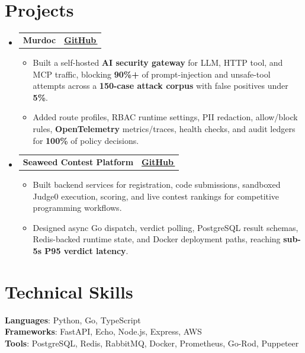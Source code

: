 \documentclass[letterpaper,11pt]{article}
\makeatletter
\newcommand{\bodyhref}[2]{\href{#1}{\underline{#2}\,\faExternalLink*}}
\newcommand{\resumeItem}[1]{
  \item\small{
    {#1 \vspace{-2pt}}
  }
}
\newcommand{\resumeProjectHeading}[2]{
    \item
    \begin{tabular*}{1.001\textwidth}{l@{\extracolsep{\fill}}r}
      \small#1 & \textbf{\small #2}\\
    \end{tabular*}\vspace{-7pt}
}
\newcommand{\resumeSubHeadingListStart}{\begin{itemize}[leftmargin=0.0in, label={}]}
\newcommand{\resumeSubHeadingListEnd}{\end{itemize}}
\newcommand{\resumeItemListStart}{\begin{itemize}}
\newcommand{\resumeItemListEnd}{\end{itemize}\vspace{-5pt}}
\makeatother
\begin{document}
\section{Projects}
    \resumeSubHeadingListStart
\resumeProjectHeading
{\textbf{Murdoc}}{\bodyhref{https://github.com/unichronic/murdoc}{GitHub}}
\resumeItemListStart
\resumeItem{Built a self-hosted \textbf{AI security gateway} for LLM, HTTP tool, and MCP traffic, blocking \textbf{90\%+} of prompt-injection and unsafe-tool attempts across a \textbf{150-case attack corpus} with false positives under \textbf{5\%}.}
\resumeItem{Added route profiles, RBAC runtime settings, PII redaction, allow/block rules, \textbf{OpenTelemetry} metrics/traces, health checks, and audit ledgers for \textbf{100\%} of policy decisions.}
\resumeItemListEnd
\resumeProjectHeading
{\textbf{Seaweed Contest Platform}}{\bodyhref{https://github.com/unichronic/seaweed-fe}{GitHub}}
\resumeItemListStart
\resumeItem{Built backend services for registration, code submissions, sandboxed Judge0 execution, scoring, and live contest rankings for competitive programming workflows.}
\resumeItem{Designed async Go dispatch, verdict polling, PostgreSQL result schemas, Redis-backed runtime state, and Docker deployment paths, reaching \textbf{sub-5s P95 verdict latency}.}
\resumeItemListEnd
    \resumeSubHeadingListEnd


%
\section{Technical Skills}
 \begin{itemize}[leftmargin=0.15in, label={}]
    \small{\item{
     \textbf{Languages}{: Python, Go, TypeScript} \\
    \textbf{Frameworks}{: FastAPI, Echo, Node.js, Express, AWS} \\
    \textbf{Tools}{: PostgreSQL, Redis, RabbitMQ, Docker, Prometheus, Go-Rod, Puppeteer} \\
    }}
 \end{itemize}
\end{document}
